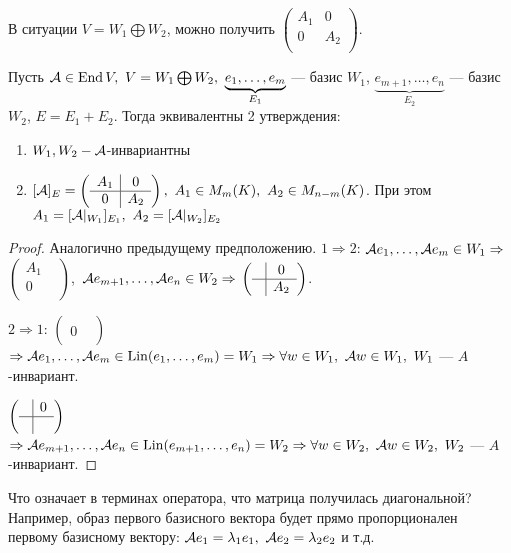 \documentclass[main]{subfiles}
\begin{document}
В ситуации $V = W_1 \bigoplus W_2$, можно получить $\left(\begin{array}{c|c}
    A_1 & 0   \\ \hline
    0   & A_2 \\
\end{array}\right)$.

\begin{proposition} 
    Пусть $\mca \in \End V,\ V=W_1 \bigoplus W_2,\ 
    \underbrace{e_1, \ldots , e_m}_{E_1}$
    — базис $W_1$, $\underbrace{e_{m+1}, \ldots , e_{n}}_{E_2}$
    — базис $W_2$, $E = E_1+E_2$. Тогда эквивалентны 2 утверждения:
    \begin{enumerate}
        \item $ W_1, W_2 - \mathcal{A} $-инвариантны
        \item $[\mathcal{A}]_E = \left(\begin{array}{c|c}
            A_1 &   0  \\
            \hline
            0   & A_2  \\         
        \end{array}\right),\ A_1 \in M_m(K),\ A_2 \in M_{n-m}(K)$.
        При этом $A_1 = [\mathcal{A}|_{W_1}]_{E_1},\ A_2 = [\mathcal{A}|_{W_2}]_{E_2}$
    \end{enumerate}
\end{proposition}

\begin{proof}
    Аналогично предыдущему предположению. 
    $1 \Rightarrow 2$: 
    $\mathcal{A} e_1, \ldots, \mathcal{A} e_m \in W_1 \Rightarrow$ $\left(\begin{array}{c|c}
    A_1 &    \\
       \hline
    0   &         \\         
    \end{array}\right)$,\
    $\mathcal{A} e_{m+1}, \ldots, \mathcal{A} e_n \in W_2 \Rightarrow$ $\left(\begin{array}{c|c}
         &  0  \\
       \hline
       &   A_2      \\         
    \end{array}\right) $.

    $2\Rightarrow 1$: 
    $\left(\begin{array}{c|c}
     &    \\
       \hline
    0   &         \\         
    \end{array}\right) $ $\Rightarrow \mathcal{A} e_1, \ldots, \mathcal{A} e_m \in \operatorname{Lin}(e_1, \ldots, e_m) = W_1
    \Rightarrow \forall w \in W_1,\ \mathcal{A} w \in W_1,\ W_1$ — $A$-инвариант.

    $\left(\begin{array}{c|c}
        &   0 \\
          \hline
        &     \\         
       \end{array}\right) $ $\Rightarrow \mathcal{A} e_{m+1}, \ldots, \mathcal{A} e_n \in \operatorname{Lin}(e_{m+1}, \ldots, e_n) = W_2
       \Rightarrow \forall w \in W_2,\ \mathcal{A} w \in W_2,\ W_2$ — $A$-инвариант.
\end{proof}

Что означает в терминах оператора, что матрица получилась диагональной? Например, образ первого базисного вектора будет 
прямо пропорционален первому базисному вектору: $\mathcal{A} e_1 = \lambda_1 e_1,\ \mathcal{A} e_2 = \lambda_2 e_2$ и т.д.
 
\end{document}
